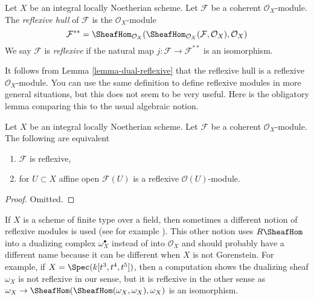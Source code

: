 \begin{definition}
\label{definition-reflexive}
Let $X$ be an integral locally Noetherian scheme. Let $\mathcal{F}$
be a coherent $\mathcal{O}_X$-module. The {\it reflexive hull}
of $\mathcal{F}$ is the $\mathcal{O}_X$-module
$$
\mathcal{F}^{**} = \SheafHom_{\mathcal{O}_X}(
\SheafHom_{\mathcal{O}_X}(\mathcal{F}, \mathcal{O}_X), \mathcal{O}_X)
$$
We say $\mathcal{F}$ is {\it reflexive} if the natural map
$j : \mathcal{F} \longrightarrow \mathcal{F}^{**}$
is an isomorphism.
\end{definition}

\noindent
It follows from Lemma \ref{lemma-dual-reflexive} that the reflexive hull
is a reflexive $\mathcal{O}_X$-module.
You can use the same definition to define reflexive modules in more
general situations, but this does not seem to be very useful.
Here is the obligatory lemma comparing this to the usual algebraic notion.

\begin{lemma}
\label{lemma-check-reflexive-on-affines}
Let $X$ be an integral locally Noetherian scheme. Let $\mathcal{F}$ be a
coherent $\mathcal{O}_X$-module. The following are equivalent
\begin{enumerate}
\item $\mathcal{F}$ is reflexive,
\item for $U \subset X$ affine open $\mathcal{F}(U)$
is a reflexive $\mathcal{O}(U)$-module.
\end{enumerate}
\end{lemma}

\begin{proof}
Omitted.
\end{proof}

\begin{remark}
\label{remark-different-reflexive}
If $X$ is a scheme of finite type over a field, then sometimes a different
notion of reflexive modules is used (see for example
\cite[bottom of page 5 and Definition 1.1.9]{HL}).
This other notion uses $R\SheafHom$ into a dualizing complex
$\omega_X^\bullet$ instead of into $\mathcal{O}_X$ and
should probably have a different name because it can be different
when $X$ is not Gorenstein. For example, if
$X = \Spec(k[t^3, t^4, t^5])$, then a computation shows the dualizing
sheaf $\omega_X$ is not reflexive in our sense, but it is reflexive in the
other sense as
$\omega_X \to \SheafHom(\SheafHom(\omega_X, \omega_X), \omega_X)$
is an isomorphism.
\end{remark}

